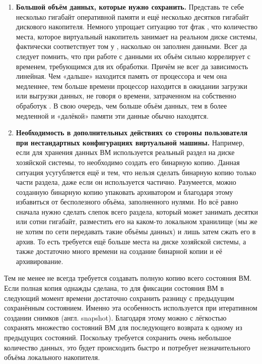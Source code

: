 \documentclass[14pt, a4paper]{article}
\begin{document}
\begin{enumerate}
    \item \textbf{Большой объём данных, которые нужно сохранить.} Представь те себе несколько гигабайт
    оперативной памяти и ещё несколько десятков гигабайт дискового накопителя. Немного
    упрощает ситуацию тот фтак , что количество места, которое виртуальный накопитель
    занимает на реальном диске системы, фактически соответствует том у , насколько он заполнен
    данными. Всег да следует помнить, что при работе с данными их объём сильно коррелирует с
    временем, требующимся для их обработки. Причём не всег да зависимость линейная. Чем
    «дальше» находится память от процессора и чем она медленнее, тем больше времени
    процессор находится в ожидании загрузки или выгрузки данных, не говоря о времени,
    затраченном на собственно обработук . В свою очередь, чем больше объём данных, тем в
    более медленной и «далёкой» памяти эти данные обычно находятся.
    \item \textbf{Необходимость в дополнительных действиях со стороны пользователя при
    нестандартных конфигурациях виртуальной машины.} Например, если для хранения
    данных ВМ используется реальный раздел на диске хозяйской системы, то необходимо
    создать его бинарную копию. Данная ситуация усугубляется ещё и тем, что нельзя сделать
    бинарную копию только части раздела, даже если он используется частично. Разумеется,
    можно созданную бинарную копию упаковать архиватором и благодаря этому избавиться от
    бесполезного объёма, заполненного нулями. Но всё равно сначала нужно сделать слепок
    всего раздела, который может занимать десятки или сотни гигабайт, разместить его на
    каком-то локальном хранилище (мы же не хотим по сети передавать такие объёмы данных) и
    лишь затем сжать его в архив. То есть требуется ещё больше места на диске хозяйской
    системы, а также достаточно много времени на создание бинарной копии и её архивирование.
\end{enumerate}

Тем не менее не всегда требуется создавать полную копию всего состояния ВМ. Если полная копия
однажды сделана, то для фиксации состояния ВМ в следующий момент времени достаточно
сохранить разницу с предыдущим сохранённым состоянием. Именно эта особенность используется
при итеративном создании снимков (англ. snapshot). Благодаря этому можно с лёгкостью сохранять
множество состояний ВМ для последующего возврата к одному из предыдущих состояний. Поскольку
требуется сохранить очень небольшое количество данных, это будет происходить быстро и потребует
незначительного объёма локального накопителя.\\
\end{document}

